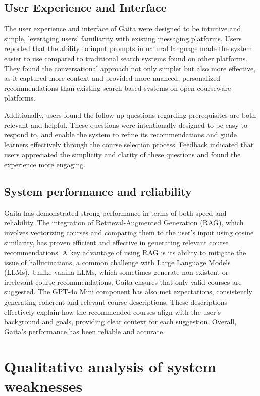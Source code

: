 \subsection{User Experience and Interface}

The user experience and interface of Gaita were designed to be intuitive and simple, leveraging users' familiarity with existing messaging platforms. Users reported that the ability to input prompts in natural language made the system easier to use compared to traditional search systems found on other platforms. They found the conversational approach not only simpler but also more effective, as it captured more context and provided more nuanced, personalized recommendations than existing search-based systems on open courseware platforms.

Additionally, users found the follow-up questions regarding prerequisites are both relevant and helpful. These questions were intentionally designed to be easy to respond to, and enable the system to refine its recommendations and guide learners effectively through the course selection process. Feedback indicated that users appreciated the simplicity and clarity of these questions and found the experience more engaging. 

\subsection{System performance and reliability}

Gaita has demonstrated strong performance in terms of both speed and reliability. The integration of Retrieval-Augmented Generation (RAG), which involves vectorizing courses and comparing them to the user’s input using cosine similarity, has proven efficient and effective in generating relevant course recommendations. A key advantage of using RAG is its ability to mitigate the issue of hallucinations, a common challenge with Large Language Models (LLMs). Unlike vanilla LLMs, which sometimes generate non-existent or irrelevant course recommendations, Gaita ensures that only valid courses are suggested. The GPT-4o Mini component has also met expectations, consistently generating coherent and relevant course descriptions. These descriptions effectively explain how the recommended courses align with the user’s background and goals, providing clear context for each suggestion. Overall, Gaita's performance has been reliable and accurate.

\section{Qualitative analysis of system weaknesses}

